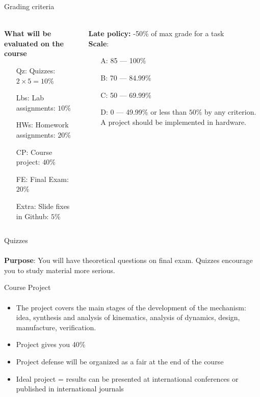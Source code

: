 \documentclass[aspectratio=169]{beamer}
\begin{document}
\begin{frame}[t]{Grading criteria}
    \framesubtitle{}
    \begin{columns}[T,onlytextwidth]
        \begin{column}{0.49\textwidth}
            \textbf{What will be evaluated on the course}
            \begin{itemize}
                \item[Qz:] Quizzes: $2\times 5=10\%$ 
                \item[Lbs:] Lab assignments: $10\%$
                \item[HWs:] Homework assignments: $20\%$
                \item[CP:] Course project: $40\%$
                \item[FE:] Final Exam: $20\%$
                \item[Extra:] Slide fixes in Github: $5\%$ 
            \end{itemize}
        \end{column}
        \begin{column}{0.49\textwidth}
            \textbf{Late policy:} -50\% of max grade for a task \\
            \textbf{Scale}:
            \begin{itemize}
                \item[A:] 85 --- 100\%
                \item[B:] 70 --- 84.99\%
                \item[C:] 50 --- 69.99\%
                \item[D:] 0 --- 49.99\% or less than $50\%$ by any criterion. A project should be implemented in hardware.
            \end{itemize}
        \end{column}
    \end{columns}
\end{frame}

\begin{frame}[t]{Quizzes}
    \framesubtitle{}
        \textbf{Purpose}: You will have theoretical questions on final exam. Quizzes encourage you to study material more serious.
    \end{frame}

\begin{frame}[t]{Course Project}
    \framesubtitle{}
    \begin{itemize}
        \item The project covers the main stages of the development of the mechanism: idea, synthesis and analysis of kinematics, analysis of dynamics, design, manufacture, verification.
        \item Project gives you 40\%
        \item Project defense will be organized as a fair at the end of the course
        \item Ideal project = results can be presented at international conferences or published in international journals
    \end{itemize}
\end{frame}
\end{document}
